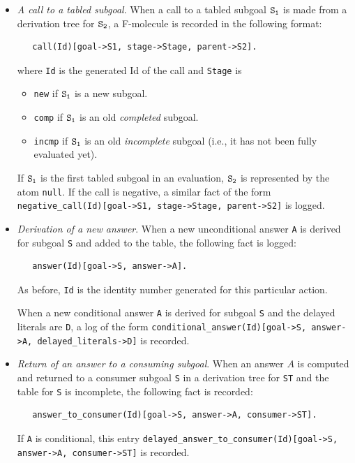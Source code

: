 \documentclass[11pt]{article}
\begin{document}
\begin{itemize}
\item \emph{A call to a tabled subgoal}. When a call to a tabled subgoal $\tt S_1$ is
  made from a derivation tree for $\tt S_2$, a F-molecule is recorded in
  the following format:
\begin{verbatim}
   call(Id)[goal->S1, stage->Stage, parent->S2].
\end{verbatim}
  where {\tt Id} is the generated Id of the call and {\tt Stage} is
  \begin{itemize}
  \item {\tt new} if $\tt S_1$ is a new subgoal.
  \item {\tt comp} if $\tt S_1$ is an old \emph{completed} subgoal.
  \item {\tt incmp} if $\tt S_1$ is an old \emph{incomplete} subgoal (i.e., it
    has not been fully evaluated yet).
  \end{itemize}

  If $\tt S_1$ is the first tabled subgoal in an evaluation, $\tt S_2$ is
  represented by the atom {\tt null}.
  If the call is negative, a similar fact of the form
  {\tt negative\_call(Id)[goal->S1, stage->Stage, parent->S2]} is logged. 
  
\item \emph{Derivation of a new answer}. When a new unconditional
  answer {\tt A} is derived for  
  subgoal \texttt{S}  and added to the table, the following fact is logged:
\begin{verbatim}
   answer(Id)[goal->S, answer->A].
\end{verbatim}
  As before, {\tt Id} is the identity number generated for this particular
  action. 

  When a new conditional answer {\tt A} is derived for subgoal \texttt{S}
  and the delayed literals are {\tt D}, a log of the form
  {\tt conditional\_answer(Id)[goal->S, answer->A, delayed\_literals->D]}
  is recorded. 

\item \emph{Return of an answer to a consuming subgoal}. When an answer $A$ is
  computed and
  returned to a consumer subgoal \texttt{S} in a derivation tree for
  \texttt{ST}  and the
  table for \texttt{S}
  is incomplete, the following fact is recorded:
\begin{verbatim}  
   answer_to_consumer(Id)[goal->S, answer->A, consumer->ST].
\end{verbatim}  
  If \texttt{A} is conditional, this entry
  {\tt delayed\_answer\_to\_consumer(Id)[goal->S, answer->A, consumer->ST]} 
  is recorded. 


\end{itemize}
\end{document}
